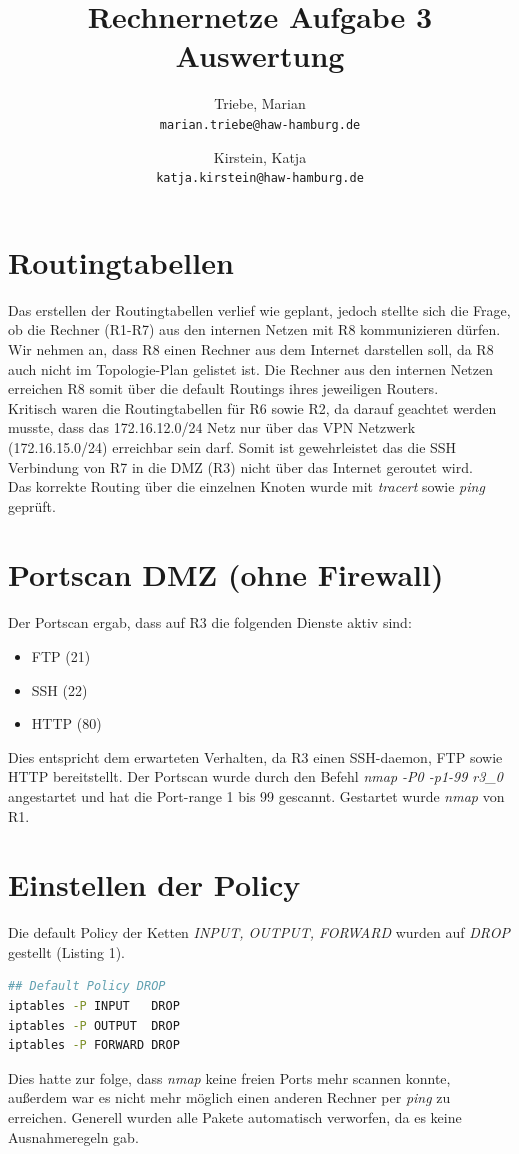 \documentclass[a4paper,10pt]{article}
\title{Rechnernetze Aufgabe 3 Auswertung}
\author{
  Triebe, Marian\\
  \texttt{marian.triebe@haw-hamburg.de}
  \and
  Kirstein, Katja\\
  \texttt{katja.kirstein@haw-hamburg.de}
}
\begin{document}
\maketitle
\tableofcontents
\newpage

\section{Routingtabellen}
Das erstellen der Routingtabellen verlief wie geplant, jedoch stellte sich die Frage, ob
die Rechner (R1-R7) aus den internen Netzen mit R8 kommunizieren dürfen. Wir nehmen an, dass R8
einen Rechner aus dem Internet darstellen soll, da R8 auch nicht im Topologie-Plan gelistet ist.
Die Rechner aus den internen Netzen erreichen R8 somit über die default Routings ihres jeweiligen Routers.\\
\newline
Kritisch waren die Routingtabellen für R6 sowie R2, da darauf geachtet werden musste, dass das 172.16.12.0/24 Netz
nur über das VPN Netzwerk (172.16.15.0/24) erreichbar sein darf. Somit ist gewehrleistet das die SSH Verbindung von R7
in die DMZ (R3) nicht über das Internet geroutet wird.\\
\newline
Das korrekte Routing über die einzelnen Knoten wurde mit \textit{tracert} sowie \textit{ping} geprüft.

\section{Portscan DMZ (ohne Firewall)}
Der Portscan ergab, dass auf R3 die folgenden Dienste aktiv sind:
\begin{itemize}
 \item FTP (21)
 \item SSH (22)
 \item HTTP (80)
\end{itemize}
Dies entspricht dem erwarteten Verhalten, da R3 einen SSH-daemon, FTP sowie HTTP bereitstellt. Der Portscan wurde
durch den Befehl \textit{nmap -P0 -p1-99 r3\_0} angestartet und hat die Port-range 1 bis 99 gescannt. Gestartet wurde
\textit{nmap} von R1.

\section{Einstellen der Policy}
Die default Policy der Ketten \textit{INPUT, OUTPUT, FORWARD} wurden auf \textit{DROP} gestellt (Listing 1).
\begin{lstlisting}[language=bash,caption={Default Policy}]
## Default Policy DROP
iptables -P INPUT   DROP
iptables -P OUTPUT  DROP
iptables -P FORWARD DROP
\end{lstlisting}
Dies hatte zur folge, dass \textit{nmap} keine freien Ports mehr scannen konnte, außerdem war es nicht mehr möglich
einen anderen Rechner per \textit{ping} zu erreichen. Generell wurden alle Pakete automatisch verworfen, da es keine
Ausnahmeregeln gab.
\end{document}
